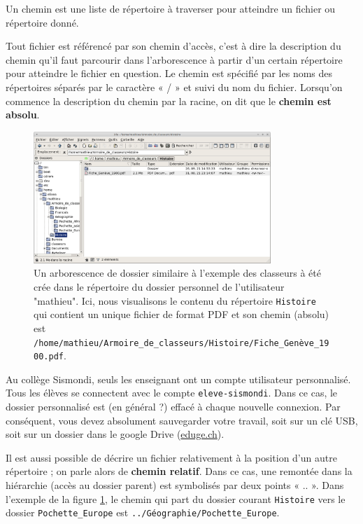 \begin{mydefinition}
	Un chemin est une liste de répertoire à traverser pour atteindre un fichier ou répertoire donné.
\end{mydefinition}
Tout fichier est référencé par son chemin d’accès, c’est à dire la description du chemin qu’il faut parcourir dans l’arborescence à partir d’un certain répertoire pour atteindre le fichier en question. Le chemin est spécifié par les noms des répertoires séparés par le caractère « / » et suivi du nom du fichier. Lorsqu’on commence la description du chemin par la racine, on dit que le \textbf{chemin est absolu}.
\begin{figure}[h!]
	\centering
	\includegraphics[trim=0 0 0 0,width=0.8\textwidth]{Images/OS/Exemple_arbo_linux}
	\caption{Un arborescence de dossier similaire à l'exemple des classeurs à été crée dans le répertoire du dossier personnel de l'utilisateur "mathieu". Ici, nous visualisons le contenu du répertoire \lstinline{Histoire} qui contient un unique fichier de format PDF et son chemin (absolu) est \lstinline{/home/mathieu/Armoire_de_classeurs/Histoire/Fiche_Genève_1900.pdf}.}
	\label{ex_chemin}
\end{figure}

\begin{important}
	Au collège Sismondi, seuls les enseignant ont un compte utilisateur personnalisé. Tous les élèves se connectent avec le compte  \lstinline{eleve-sismondi}. Dans ce cas, le dossier personnalisé est (en général ?) effacé à chaque nouvelle connexion. Par conséquent, vous devez absolument sauvegarder votre travail, soit sur un clé USB, soit sur un dossier dans le google Drive (\url{eduge.ch}).
\end{important}	
\begin{eclairage}
	 Il est aussi possible de décrire un fichier relativement à la position d’un autre répertoire ; on parle alors de \textbf{chemin relatif}. Dans ce cas, une remontée dans la hiérarchie (accès au dossier parent) est symbolisés par deux points « .. ». Dans l'exemple de la figure \ref{ex_chemin}, le chemin qui part du dossier courant \lstinline{Histoire} vers le dossier \lstinline{Pochette_Europe} est \lstinline{../Géographie/Pochette_Europe}.
\end{eclairage}


